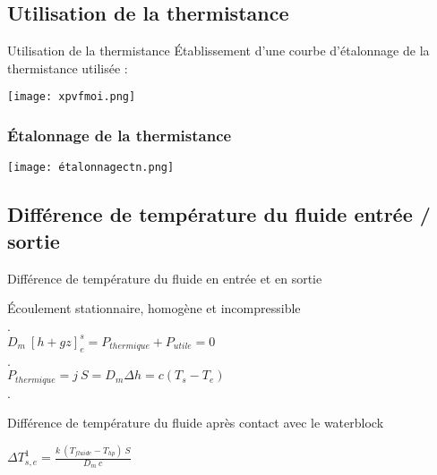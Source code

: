 \documentclass[hyperref={pdfpagelabels=false}]{beamer}
\begin{document}
\subsection*{Utilisation de la thermistance}\label{e14}
\begin{frame}{Utilisation de la thermistance}
Établissement d'une courbe d'étalonnage de la thermistance utilisée :\begin{center}
\texttt{[image: xpvfmoi.png]}
 \label{fig}
\end{center}
\end{frame}
\begin{frame}
\frametitle{Étalonnage de la thermistance}
\begin{center}
\texttt{[image: étalonnagectn.png]} \label{fig}
\end{center}
\end{frame}




\subsection*{Différence de température du fluide entrée / sortie}\label{e15}
\begin{frame}{Différence de température du fluide en entrée et en sortie}


Écoulement stationnaire, homogène et incompressible \\
{\color{white}.}\\
$D_m~[h+ gz]_{e}^{s} = P_{thermique} + P_{utile} = 0$\\
{\color{white}.} \\
$ P_{thermique} = j~S = D_m \Delta h = c (T_s - T_e) $ \\

{\color{white}.} \\

\begin{exampleblock}{Différence de température du fluide après contact avec le waterblock}
\begin{center} $\Delta T_{s,e}^{1} = \frac{k ~(T_{fluide} - T_{hp} ) ~S}{D_m~c}$ \end{center}
\end{exampleblock}
\end{frame}
\end{document}
